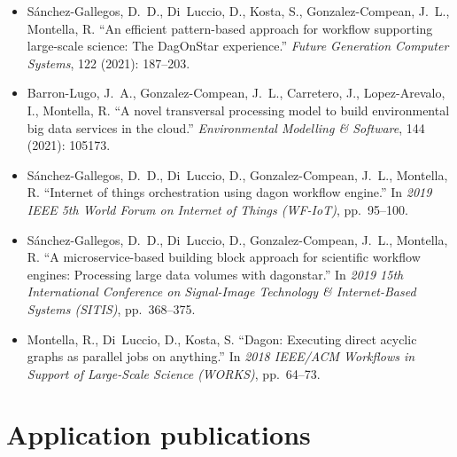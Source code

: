 \begin{itemize}[leftmargin=1.4em]
\item Sánchez-Gallegos, D.~D., Di~Luccio, D., Kosta, S., Gonzalez-Compean, J.~L., Montella, R.
``An efficient pattern-based approach for workflow supporting large-scale
science: The DagOnStar experience.'' \textit{Future Generation Computer
Systems}, 122 (2021): 187--203.

\item Barron-Lugo, J.~A., Gonzalez-Compean, J.~L., Carretero, J., Lopez-Arevalo, I., Montella, R.
``A novel transversal processing model to build environmental big data
services in the cloud.'' \textit{Environmental Modelling \& Software}, 144
(2021): 105173.

\item Sánchez-Gallegos, D.~D., Di~Luccio, D., Gonzalez-Compean, J.~L., Montella, R.
``Internet of things orchestration using dagon workflow engine.'' In
\textit{2019 IEEE 5th World Forum on Internet of Things (WF-IoT)}, pp.~95--100.

\item Sánchez-Gallegos, D.~D., Di~Luccio, D., Gonzalez-Compean, J.~L., Montella, R.
``A microservice-based building block approach for scientific workflow
engines: Processing large data volumes with dagonstar.'' In \textit{2019 15th
International Conference on Signal-Image Technology \& Internet-Based Systems
(SITIS)}, pp.~368--375.

\item Montella, R., Di~Luccio, D., Kosta, S.
``Dagon: Executing direct acyclic graphs as parallel jobs on anything.'' In
\textit{2018 IEEE/ACM Workflows in Support of Large-Scale Science (WORKS)},
pp.~64--73.
\end{itemize}

\section*{Application publications}


